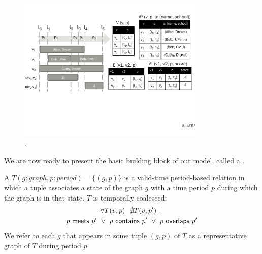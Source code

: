 \begin{figure}
\centering
\includegraphics[width=3.5in]{figs/T1_rel_tab.pdf}
\caption{\tg {}.}
\label{fig:tg_ve}
\end{figure}



We are now ready to present the basic building block of our model,
called a \tg.  

\begin{definition}[TGraph]
A \tg $T(g:graph, p:period) = \{ (g,p) \}$ is a valid-time
period-based relation in which a tuple associates a state of the graph
$g$ with a time period $p$ during which the graph is in that state.
$T$ is temporally coalesced:
\begin{multline}
\forall T(v,p)~~\nexists T(v,p')~~| \\
        p~\mathsf{meets}~p'~\lor~p~\mathsf{contains}~p'~\lor~p~\mathsf{overlaps}~p'
\end{multline}
We refer to each $g$ that appears in some tuple $(g,p)$ of $T$ as a
representative graph of $T$ during period $p$.

\label{def:tg_abstract}
\end{definition}

